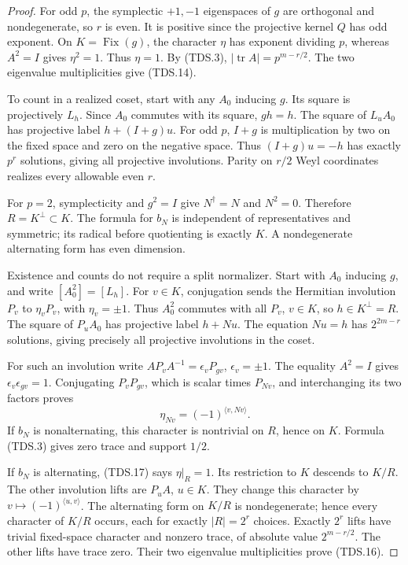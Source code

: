 \begin{proof}
For odd \(p\), the symplectic \(+1,-1\) eigenspaces of \(g\) are
orthogonal and nondegenerate, so \(r\) is even.  It is positive
since the projective kernel \(Q\) has odd exponent.
On \(K=\operatorname{Fix}(g)\), the character \(\eta\) has exponent
dividing \(p\), whereas \(A^2=I\) gives \(\eta^2=1\).  Thus \(\eta=1\).
By (TDS.3), \(|\operatorname{tr}A|=p^{m-r/2}\).
The two eigenvalue multiplicities give (TDS.14).

To count in a realized coset, start with any \(A_0\) inducing \(g\).
Its square is projectively \(L_h\).  Since \(A_0\) commutes with
its square, \(gh=h\).  The square of \(L_uA_0\) has projective
label \(h+(I+g)u\).
For odd \(p\), \(I+g\) is multiplication by two on the fixed space
and zero on the negative space.  Thus \((I+g)u=-h\) has exactly
\(p^r\) solutions, giving all projective involutions.
Parity on \(r/2\) Weyl coordinates realizes every allowable even \(r\).

For \(p=2\), symplecticity and \(g^2=I\) give
\(N^\dagger=N\) and \(N^2=0\).  Therefore \(R=K^\perp\subset K\).
The formula for \(b_N\) is independent of representatives and
symmetric; its radical before quotienting is exactly \(K\).
A nondegenerate alternating form has even dimension.

Existence and counts do not require a split normalizer.
Start with \(A_0\) inducing \(g\), and write \([A_0^2]=[L_h]\).
For \(v\in K\), conjugation sends the Hermitian involution \(P_v\)
to \(\eta_vP_v\), with \(\eta_v=\pm1\).
Thus \(A_0^2\) commutes with all \(P_v\), \(v\in K\), so
\(h\in K^\perp=R\).  The square of \(P_uA_0\) has projective
label \(h+Nu\).  The equation \(Nu=h\) has \(2^{2m-r}\) solutions,
giving precisely all projective involutions in the coset.

For such an involution write \(A P_vA^{-1}=\epsilon_vP_{gv}\),
\(\epsilon_v=\pm1\).  The equality \(A^2=I\) gives
\(\epsilon_v\epsilon_{gv}=1\).
Conjugating \(P_vP_{gv}\), which is scalar times \(P_{Nv}\), and
interchanging its two factors proves
\[
                       \eta_{Nv}=(-1)^{\langle v,Nv\rangle}.
 \tag{TDS.17}
\]
If \(b_N\) is nonalternating, this character is nontrivial on \(R\),
hence on \(K\).  Formula (TDS.3) gives zero trace and support \(1/2\).

If \(b_N\) is alternating, (TDS.17) says \(\eta|_R=1\).
Its restriction to \(K\) descends to \(K/R\).
The other involution lifts are \(P_uA\), \(u\in K\).
They change this character by
\(v\mapsto(-1)^{\langle u,v\rangle}\).
The alternating form on \(K/R\) is nondegenerate; hence every
character of \(K/R\) occurs, each for exactly \(|R|=2^r\) choices.
Exactly \(2^r\) lifts have trivial fixed-space character and
nonzero trace, of absolute value \(2^{m-r/2}\).
The other lifts have trace zero.  Their two eigenvalue
multiplicities prove (TDS.16).


\end{proof}
